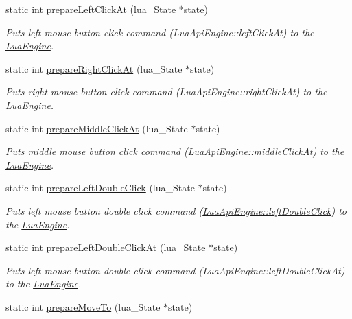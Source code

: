 \begin{DoxyCompactItemize}
static int \hyperlink{class_lua_api_engine_a2109f8d536e8238941ea3d5254feee6e}{prepare\-Left\-Click\-At} (lua\-\_\-\-State $\ast$state)
\begin{DoxyCompactList}\small\item\em Puts left mouse button click command (Lua\-Api\-Engine\-::left\-Click\-At) to the \hyperlink{class_lua_engine}{Lua\-Engine}. \end{DoxyCompactList}\item 
static int \hyperlink{class_lua_api_engine_ac5b06389118f48d5e320b81c3c5ba5d0}{prepare\-Right\-Click\-At} (lua\-\_\-\-State $\ast$state)
\begin{DoxyCompactList}\small\item\em Puts right mouse button click command (Lua\-Api\-Engine\-::right\-Click\-At) to the \hyperlink{class_lua_engine}{Lua\-Engine}. \end{DoxyCompactList}\item 
static int \hyperlink{class_lua_api_engine_a3ecc218b3b366bde3d8c4e7c8f039f5e}{prepare\-Middle\-Click\-At} (lua\-\_\-\-State $\ast$state)
\begin{DoxyCompactList}\small\item\em Puts middle mouse button click command (Lua\-Api\-Engine\-::middle\-Click\-At) to the \hyperlink{class_lua_engine}{Lua\-Engine}. \end{DoxyCompactList}\item 
static int \hyperlink{class_lua_api_engine_ab545cafb77e825b84d787d0dbae34bc2}{prepare\-Left\-Double\-Click} (lua\-\_\-\-State $\ast$state)
\begin{DoxyCompactList}\small\item\em Puts left mouse button double click command (\hyperlink{class_lua_api_engine_a2004f3ce56fc785e0276491642e39e7a}{Lua\-Api\-Engine\-::left\-Double\-Click}) to the \hyperlink{class_lua_engine}{Lua\-Engine}. \end{DoxyCompactList}\item 
static int \hyperlink{class_lua_api_engine_afb3a41719b02c24b851ff53a029207e6}{prepare\-Left\-Double\-Click\-At} (lua\-\_\-\-State $\ast$state)
\begin{DoxyCompactList}\small\item\em Puts left mouse button double click command (Lua\-Api\-Engine\-::left\-Double\-Click\-At) to the \hyperlink{class_lua_engine}{Lua\-Engine}. \end{DoxyCompactList}\item 
static int \hyperlink{class_lua_api_engine_a700aa78e4509bca70b5b23cfe98ce7b3}{prepare\-Move\-To} (lua\-\_\-\-State $\ast$state)

\end{DoxyCompactItemize}
